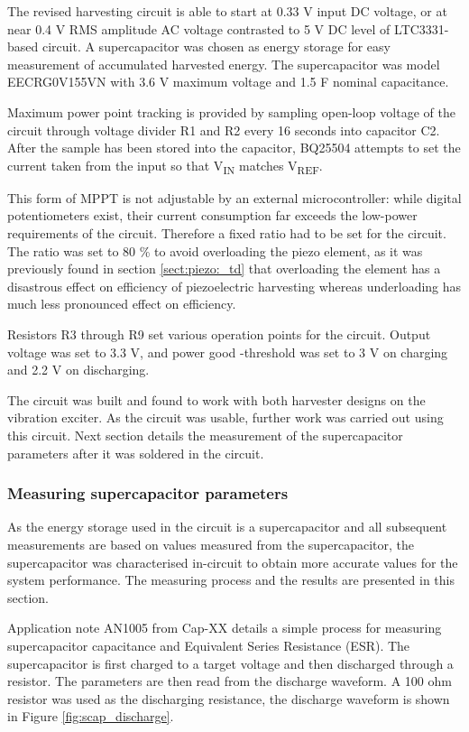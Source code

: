 The revised harvesting circuit is able to start at 0.33 V input DC voltage, or at near 0.4 V RMS amplitude AC voltage contrasted to 5 V DC level of LTC3331-based circuit. A supercapacitor was chosen as energy storage for easy measurement of accumulated harvested energy. The supercapacitor was model EECRG0V155VN \cite{panasonic_scap} with 3.6 V maximum voltage and 1.5 F nominal capacitance. 

Maximum power point tracking is provided by sampling open-loop voltage of the circuit through voltage divider R1 and R2 every 16 seconds into capacitor C2. After the sample has been stored into the capacitor, BQ25504 attempts to set the current taken from the input so that V\textsubscript{IN} matches V\textsubscript{REF}. 

This form of MPPT is not adjustable by an external microcontroller: while digital potentiometers exist, their current consumption far exceeds the low-power requirements of the circuit. Therefore a fixed ratio had to be set for the circuit. The ratio was set to 80 \% to avoid overloading the piezo element, as it was previously found in section \ref{sect:piezo:_td} that overloading the element has a disastrous effect on efficiency of piezoelectric harvesting whereas underloading has much less pronounced effect on efficiency.

Resistors R3 through R9 set various operation points for the circuit. Output voltage was set to 3.3 V, and power good -threshold was set to 3 V on charging and 2.2 V on discharging. 

The circuit was built and found to work with both harvester designs on the vibration exciter. As the circuit was usable, further work was carried out using this circuit. Next section details the measurement of the supercapacitor parameters after it was soldered in the circuit.

\subsubsection{Measuring supercapacitor parameters}
As the energy storage used in the circuit is a supercapacitor and all subsequent measurements are based on values measured from the supercapacitor, the supercapacitor was characterised in-circuit to obtain more accurate values for the system performance. The measuring process and the results are presented in this section.

Application note AN1005 from Cap-XX \cite{an1005} details a simple process for measuring supercapacitor capacitance and Equivalent Series Resistance (ESR). The supercapacitor is first charged to a target voltage and then discharged through a resistor. The parameters are then read from the discharge waveform. A 100 ohm resistor was used as the discharging resistance, the discharge waveform is shown in Figure \ref{fig:scap_discharge}. 

